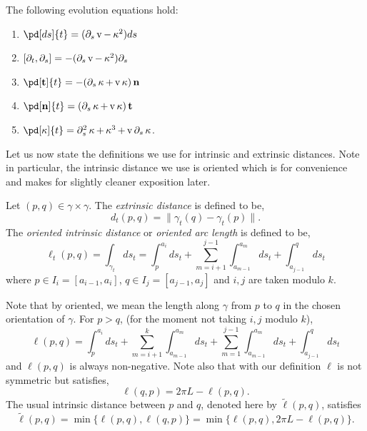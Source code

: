 \documentclass[12pt]{amsart}
\begin{document}
\begin{lemma}
\label{lem:basic_evolution}
The following evolution equations hold:
\begin{enumerate}
\item \(\pd[ds]{t} = (\partial_s \tangspeed - \curvecurv^2) ds\)
\item \([\partial_t, \partial_s] = -(\partial_s \operatorname{v} - \operatorname{\kappa}^2) \partial_s\)
\item \(\pd[\tang]{t} = -(\partial_s \curvecurv + \tangspeed\curvecurv) \nor\)
\item \(\pd[\nor]{t} = (\partial_s \curvecurv + \tangspeed\curvecurv) \tang\)
\item \(\pd[\curvecurv]{t} = \partial_s^2 \curvecurv + \curvecurv^3 + \tangspeed \partial_s \curvecurv\).
\end{enumerate}
\end{lemma}

Let us now state the definitions we use for intrinsic and extrinsic distances. Note in particular, the intrinsic distance we use is oriented which is for convenience and makes for slightly cleaner exposition later.

\begin{defn}
\label{defn:dist}
Let \((p,q) \in \gamma \times \gamma\). The \emph{extrinsic distance} is defined to be,
\[
d_t(p, q) = \|\gamma_t(q) - \gamma_t(p)\|.
\]
The \emph{oriented intrinsic distance} or \emph{oriented arc length} is defined to be,
\[
\ell_t(p, q) = \int_{\gamma_t} ds_t = \int_p^{a_i} ds_t + \sum_{m=i+1}^{j-1} \int_{a_{m-1}}^{a_m} ds_t + \int_{a_{j-1}}^q ds_t
\]
where \(p \in I_i = [a_{i-1}, a_i]\), \(q \in I_j = [a_{j-1}, a_j]\) and \(i,j\) are taken modulo \(k\).
\end{defn}

Note that by oriented, we mean the length along \(\gamma\) from \(p\) to \(q\) in the chosen orientation of \(\gamma\). For \(p > q\), (for the moment not taking \(i,j\) modulo \(k\)),
\[
\ell(p, q) = \int_p^{a_i} ds_t + \sum_{m=i+1}^{k} \int_{a_{m-1}}^{a_m} ds_t + \sum_{m=1}^{j-1} \int_{a_{m-1}}^{a_m} ds_t + \int_{a_{j-1}}^q ds_t
\]
and \(\ell(p, q)\) is always non-negative. Note also that with our definition \(\ell\) is not symmetric but satisfies,
\begin{equation}
\label{eq:ell_symmetry}
\ell(q, p) = 2\pi L - \ell(p, q).
\end{equation}
The usual intrinsic distance between \(p\) and \(q\), denoted here by \(\tilde{\ell}(p, q)\), satisfies
\[
\tilde{\ell}(p, q) = \min\{\ell(p, q), \ell(q, p)\} = \min\{\ell(p, q), 2\pi L - \ell(p, q)\}.
\]
\end{document}
